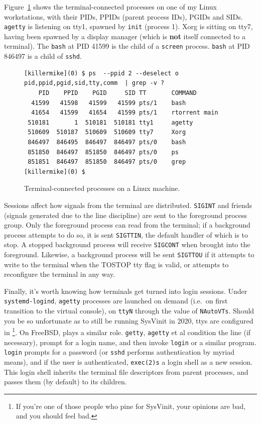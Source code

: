 Figure~\ref{fig:termprocs} shows the terminal-connected processes on one of
my Linux workstations, with their PIDs, PPIDs (parent process IDs), PGIDs
and SIDs. \texttt{agetty} is listening on tty1, spawned by
\texttt{init} (process 1). Xorg is sitting on tty7, having been spawned by a
display manager (which is \textbf{not} itself connected to a terminal). The
\texttt{bash} at PID 41599 is the child of a \texttt{screen} process.
\texttt{bash} at PID 846497 is a child of \texttt{sshd}.

\begin{figure}[!htb]
  \centering
\begin{verbatim}
[killermike](0) $ ps  --ppid 2 --deselect o pid,ppid,pgid,sid,tty,comm  | grep -v ?
    PID    PPID    PGID     SID TT       COMMAND
  41599   41598   41599   41599 pts/1    bash
  41654   41599   41654   41599 pts/1    rtorrent main
 510181       1  510181  510181 tty1     agetty
 510609  510187  510609  510609 tty7     Xorg
 846497  846495  846497  846497 pts/0    bash
 851850  846497  851850  846497 pts/0    ps
 851851  846497  851850  846497 pts/0    grep
[killermike](0) $
\end{verbatim}
\caption{Terminal-connected processes on a Linux machine.}
\label{fig:termprocs}
\end{figure}

Sessions affect how signals from the terminal are distributed. \texttt{SIGINT}
and friends (signals generated due to the line discipline) are sent to the
foreground process group. Only the foreground process can read from the
terminal; if a background process attempts to do so, it is sent \texttt{SIGTTIN}, the default
handler of which is to stop. A stopped background process will receive
\texttt{SIGCONT} when brought into the foreground. Likewise, a background
process will be sent \texttt{SIGTTOU} if it attempts to write to the terminal
when the TOSTOP tty flag is valid, or attempts to reconfigure the terminal in
any way\cite{sigterminals}.

Finally, it's worth knowing how terminals get turned into login sessions. Under
\texttt{systemd-logind}\cite{logind}, \texttt{agetty} processes are launched
on demand (i.e.\ on first transition to the virtual console), on \texttt{ttyN}
through the value of \texttt{NAutoVTs}. Should you be so unfortunate as to
still be running SysVinit in 2020, ttys are configured in \footnote{If you're one of those people who pine for SysVinit, your opinions are bad, and you should feel bad.}.
On FreeBSD,  plays a similar role\cite{fbsdttys5}. \texttt{getty},
\texttt{agetty} et al condition the line (if necessary), prompt for a login
name, and then invoke \texttt{login} or a similar program. \texttt{login} prompts
for a password (or \texttt{sshd} performs authentication by myriad means), and
if the user is authenticated, \texttt{exec(2)s} a login shell as a new session.
This login shell inherits the terminal file descriptors from parent processes,
and passes them (by default) to its children.

